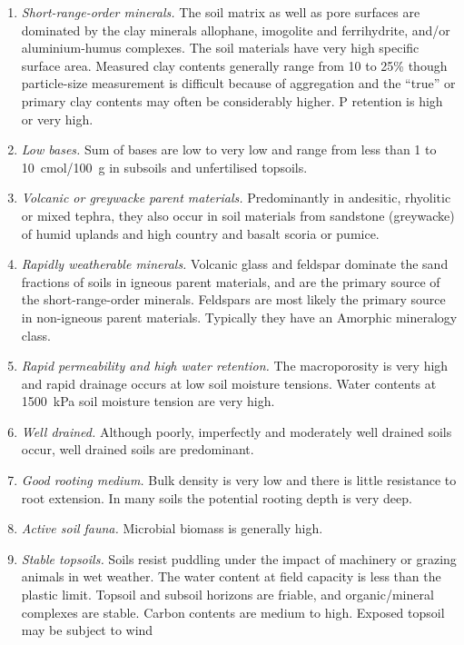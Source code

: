 \documentclass[
  letterpaper,
  DIV=11,
  numbers=noendperiod]{scrreprt}
\providecommand{\tightlist}{%
  \setlength{\itemsep}{0pt}\setlength{\parskip}{0pt}}\usepackage{longtable,booktabs,array}
\begin{document}
\begin{enumerate}
\def\labelenumi{\arabic{enumi}.}
\tightlist
\item
  \emph{Short-range-order minerals.} The soil matrix as well as pore
  surfaces are dominated by the clay minerals allophane, imogolite and
  ferrihydrite, and/or aluminium-humus complexes. The soil materials
  have very high specific surface area. Measured clay contents generally
  range from 10 to 25\% though particle-size measurement is difficult
  because of aggregation and the ``true'' or primary clay contents may
  often be considerably higher. P retention is high or very high.
\item
  \emph{Low bases.} Sum of bases are low to very low and range from less
  than 1 to 10~cmol/100~g in subsoils and unfertilised topsoils.
\item
  \emph{Volcanic or greywacke parent materials.} Predominantly in
  andesitic, rhyolitic or mixed tephra, they also occur in soil
  materials from sandstone (greywacke) of humid uplands and high country
  and basalt scoria or pumice.
\item
  \emph{Rapidly weatherable minerals.} Volcanic glass and feldspar
  dominate the sand fractions of soils in igneous parent materials, and
  are the primary source of the short-range-order minerals. Feldspars
  are most likely the primary source in non-igneous parent materials.
  Typically they have an Amorphic mineralogy class.
\item
  \emph{Rapid permeability and high water retention.} The macroporosity
  is very high and rapid drainage occurs at low soil moisture tensions.
  Water contents at 1500~kPa soil moisture tension are very high.
\item
  \emph{Well drained.} Although poorly, imperfectly and moderately well
  drained soils occur, well drained soils are predominant.
\item
  \emph{Good rooting medium.} Bulk density is very low and there is
  little resistance to root extension. In many soils the potential
  rooting depth is very deep.
\item
  \emph{Active soil fauna.} Microbial biomass is generally high.
\item
  \emph{Stable topsoils.} Soils resist puddling under the impact of
  machinery or grazing animals in wet weather. The water content at
  field capacity is less than the plastic limit. Topsoil and subsoil
  horizons are friable, and organic/mineral complexes are stable. Carbon
  contents are medium to high. Exposed topsoil may be subject to wind

\end{enumerate}
\end{document}

